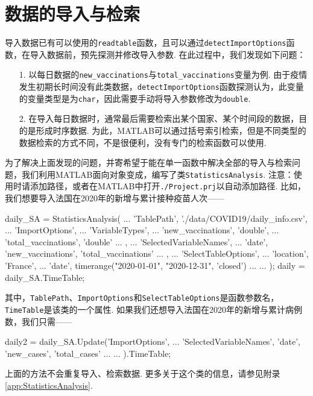\documentclass[a4paper, titlepage]{article}
\begin{document}
    \section{数据的导入与检索}\label{数据的导入}
        导入数据已有可以使用的\texttt{readtable}函数，且可以通过\texttt{detectImportOptions}函数，在导入数据前，预先探测并修改导入参数. 在此过程中，我们发现如下问题：
        \begin{enumerate}
            \item [1.] 以每日数据的\texttt{new\_vaccinations}与\texttt{total\_vaccinations}变量为例. 由于疫情发生初期长时间没有此类数据，\texttt{detectImportOptions}函数探测认为，此变量的变量类型是为\texttt{char}，因此需要手动将导入参数修改为\texttt{double}.
            \item [2.] 在导入每日数据时，通常最后需要检索出某个国家、某个时间段的数据，目的是形成时序数据. 为此，MATLAB可以通过括号索引检索，但是不同类型的数据检索的方式不同，不是很便利，没有专门的检索函数可以使用.
        \end{enumerate}
        为了解决上面发现的问题，并寄希望于能在单一函数中解决全部的导入与检索问题，我们利用MATLAB面向对象变成，编写了类\texttt{StatisticsAnalysis}. {\color{red}
        \kaishu 注意：使用时请添加路径，或者在MATLAB中打开\texttt{./Project.prj}以自动添加路径.} 比如，我们想要导入法国在2020年的新增与累计接种疫苗人次——
\begin{matlabcode}
daily_SA = StatisticsAnalysis( ...
    'TablePath', './data/COVID19/daily_info.csv', ...
    'ImportOptions', { ...
        'VariableTypes', { ...
            'new_vaccinations', 'double', ...
            'total_vaccinations', 'double' ...
            }, ...
        'SelectedVariableNames', ...
            {'date', 'new_vaccinations', 'total_vaccinations'} ...
        }, ...
    'SelectTableOptions', { ...
        'location', 'France', ...
        'date', timerange("2020-01-01", "2020-12-31", 'closed') ...
        } ...
    );
daily = daily_SA.TimeTable;
\end{matlabcode}
        其中，\texttt{TablePath}、\texttt{ImportOptions}和\texttt{SelectTableOptions}是函数参数名，\texttt{TimeTable}是该类的一个属性. 如果我们还想导入法国在2020年的新增与累计病例数，我们只需——
\begin{matlabcode}
daily2 = daily_SA.Update('ImportOptions', { ...
        'SelectedVariableNames', {'date', 'new_cases', 'total_cases'} ...
        }...
    ).TimeTable;
\end{matlabcode}
        上面的方法不会重复导入、检索数据. 更多关于这个类的信息，请参见附录\ref{app:StatisticsAnalysis}. 
\end{document}
